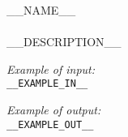 \documentclass[czech,11pt,a4paper]{article}
\begin{document}
	{ \Huge __NAME__ } \\
	\hline ~\\

	__DESCRIPTION__
	~\\[2em]

	\begin{minipage}[t]{0.5\textwidth}
		\begin{flushleft} \large
			\textit{Example of input:}\\
			\texttt{__EXAMPLE_IN__}
		\end{flushleft}
	\end{minipage}
	\begin{minipage}[t]{0.5\textwidth}
		\begin{flushleft} \large
			\textit{Example of output:}\\
			\texttt{__EXAMPLE_OUT__}
		\end{flushleft}
	\end{minipage}
\end{document}
